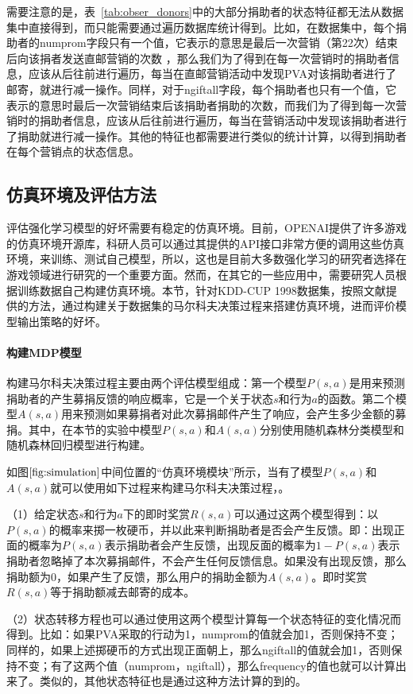 需要注意的是，表~\ref{tab:obser_donors}中的大部分捐助者的状态特征都无法从数据集中直接得到，而只能需要通过遍历数据库统计得到。比如，在数据集中，每个捐助者的numprom字段只有一个值，它表示的意思是最后一次营销（第22次）结束后向该捐者发送直邮营销的次数 ，那么我们为了得到在每一次营销时的捐助者信息，应该从后往前进行遍历，每当在直邮营销活动中发现PVA对该捐助者进行了邮寄，就进行减一操作。同样，对于ngiftall字段，每个捐助者也只有一个值，它表示的意思时最后一次营销结束后该捐助者捐助的次数，而我们为了得到每一次营销时的捐助者信息，应该从后往前进行遍历，每当在营销活动中发现该捐助者进行了捐助就进行减一操作。其他的特征也都需要进行类似的统计计算，以得到捐助者在每个营销点的状态信息。

\subsection{仿真环境及评估方法}
评估强化学习模型的好坏需要有稳定的仿真环境。目前，OPENAI提供了许多游戏的仿真环境开源库，科研人员可以通过其提供的API接口非常方便的调用这些仿真环境，来训练、测试自己模型，所以，这也是目前大多数强化学习的研究者选择在游戏领域进行研究的一个重要方面。然而，在其它的一些应用中，需要研究人员根据训练数据自己构建仿真环境。本节，针对KDD-CUP 1998数据集，按照文献\citep{pednault2002sequential}提供的方法，通过构建关于数据集的马尔科夫决策过程来搭建仿真环境，进而评价模型输出策略的好坏。

\paragraph{构建MDP模型}
构建马尔科夫决策过程主要由两个评估模型组成：第一个模型$P(s,a)$是用来预测捐助者的产生募捐反馈的响应概率，它是一个关于状态$s$和行为$a$的函数。第二个模型$A(s,a)$用来预测如果募捐者对此次募捐邮件产生了响应，会产生多少金额的募捐。其中，在本节的实验中模型$P(s,a)$和$A(s,a)$分别使用随机森林分类模型和随机森林回归模型进行构建。

如图$\ref{fig:simulation}$中间位置的“仿真环境模块”所示，当有了模型$P(s,a)$和$A(s,a)$就可以使用如下过程来构建马尔科夫决策过程，。

（1）给定状态$s$和行为$a$下的即时奖赏$R(s,a)$可以通过这两个模型得到：以$P(s,a)$的概率来掷一枚硬币，并以此来判断捐助者是否会产生反馈。即：出现正面的概率为$P(s,a)$表示捐助者会产生反馈，出现反面的概率为$1-P(s,a)$表示捐助者忽略掉了本次募捐邮件，不会产生任何反馈信息。如果没有出现反馈，那么捐助额为$0$，如果产生了反馈，那么用户的捐助金额为$A(s,a)$。即时奖赏$R(s,a)$等于捐助额减去邮寄的成本。

（2）状态转移方程也可以通过使用这两个模型计算每一个状态特征的变化情况而得到。比如：如果PVA采取的行动为1，numprom的值就会加1，否则保持不变；同样的，如果上述掷硬币的方式出现正面朝上，那么ngiftall的值就会加1，否则保持不变；有了这两个值（numprom，ngiftall），那么frequency的值也就可以计算出来了。类似的，其他状态特征也是通过这种方法计算的到的。


